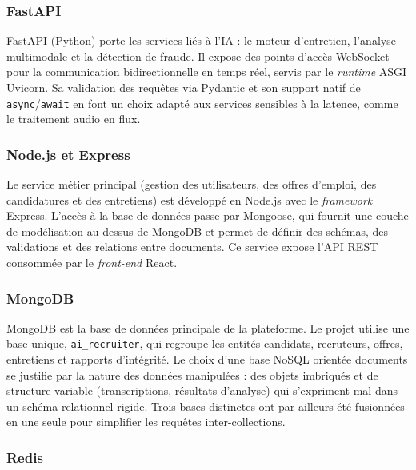 \subsubsection{FastAPI}

FastAPI (Python) porte les services liés à l'IA : le moteur d'entretien, l'analyse multimodale et la détection de fraude. Il expose des points d'accès WebSocket pour la communication bidirectionnelle en temps réel, servis par le \textit{runtime} ASGI Uvicorn. Sa validation des requêtes via Pydantic et son support natif de \texttt{async}/\texttt{await} en font un choix adapté aux services sensibles à la latence, comme le traitement audio en flux.


\subsubsection{Node.js et Express}

Le service métier principal (gestion des utilisateurs, des offres d'emploi, des candidatures et des entretiens) est développé en Node.js avec le \textit{framework} Express. L'accès à la base de données passe par Mongoose, qui fournit une couche de modélisation au-dessus de MongoDB et permet de définir des schémas, des validations et des relations entre documents. Ce service expose l'API REST consommée par le \textit{front-end} React.


\subsubsection{MongoDB}

MongoDB est la base de données principale de la plateforme. Le projet utilise une base unique, \texttt{ai\_recruiter}, qui regroupe les entités candidats, recruteurs, offres, entretiens et rapports d'intégrité. Le choix d'une base NoSQL orientée documents se justifie par la nature des données manipulées : des objets imbriqués et de structure variable (transcriptions, résultats d'analyse) qui s'expriment mal dans un schéma relationnel rigide. Trois bases distinctes ont par ailleurs été fusionnées en une seule pour simplifier les requêtes inter-collections.


\subsubsection{Redis}


